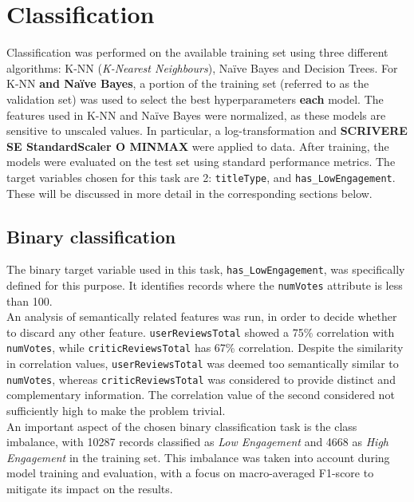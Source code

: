 
\chapter{Classification}
\label{ch:capitolo3}
Classification was performed on the available training set using three different algorithms: K-NN (\textit{K-Nearest Neighbours}), Naïve Bayes and Decision Trees.
For K-NN \textbf{and Naïve Bayes}, a portion of the training set (referred to as the validation set) was used to select the best hyperparameters \textbf{each} model.
The features used in K-NN and Naïve Bayes were normalized, as these models are sensitive to unscaled values.
In particular, a log-transformation and \textbf{SCRIVERE SE StandardScaler O MINMAX} were applied to data.
After training, the models were evaluated on the test set using standard performance metrics. 
The target variables chosen for this task are 2: \texttt{titleType}, and \texttt{has\_LowEngagement}.
These will be discussed in more detail in the corresponding sections below.

\section{Binary classification}\label{sec:binary_classification}
The binary target variable used in this task, \texttt{has\_LowEngagement}, was specifically defined for this purpose. 
It identifies records where the \texttt{numVotes} attribute is less than 100.\\

An analysis of semantically related features was run, in order to decide whether to discard any other feature.
\texttt{userReviewsTotal} showed a 75\% correlation with
\texttt{numVotes}, while \texttt{criticReviewsTotal} has 67\% correlation.
Despite the similarity in correlation
values, \texttt{userReviewsTotal} was deemed too semantically similar to \texttt{numVotes}, whereas
\texttt{criticReviewsTotal} was considered to provide distinct and complementary information.
The correlation value of the second considered not sufficiently high to make the problem trivial.\\

An important aspect of the chosen binary classification task is the class imbalance, with 10287 records
classified as \textit{Low Engagement} and 4668 as \textit{High Engagement} in the training set.
This imbalance was taken into account during model training and evaluation, with a focus on
macro-averaged F1-score to mitigate its impact on the results.\\

